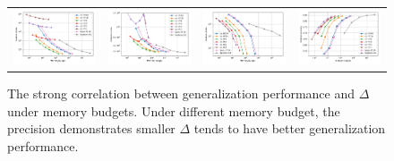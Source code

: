 \begin{figure}
	\centering
	\begin{tabular}{c c c c}
		\includegraphics[width=0.24\linewidth]{figures/regression_delta_vs_mem.pdf} &
		\includegraphics[width=0.24\linewidth]{figures/regression_l2_vs_mem.pdf} &
		\includegraphics[width=0.24\linewidth]{figures/classification_delta_vs_mem.pdf} &
		\includegraphics[width=0.24\linewidth]{figures/classification_acc_vs_mem.pdf} 
	\end{tabular}
	\caption{The strong correlation between generalization performance and $\Delta$ under memory budgets. Under different memory budget, the precision demonstrates smaller $\Delta$ tends to have better generalization performance.}
	\label{fig:generalizatio_col}
\end{figure}


